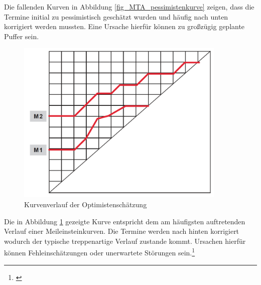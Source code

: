 Die fallenden Kurven in Abbildung \ref{fig_MTA_pessimistenkurve} zeigen, dass die Termine initial zu pessimistisch geschätzt wurden und häufig nach unten korrigiert werden mussten. Eine Ursache hierfür können zu großzügig geplante Puffer sein.

\begin{figure}[h!]
	\centering
	\includegraphics[width=10cm]{kapitel/gruppe4_2/bilder/MTA_optimistenkurve}
	\caption{Kurvenverlauf der Optimistenschätzung}
	\label{fig_MTA_optimistenkurve}
\end{figure}

Die in Abbildung \ref{fig_MTA_optimistenkurve} gezeigte Kurve entspricht dem am häufigsten auftretenden Verlauf einer Meileinsteinkurven. Die Termine werden nach hinten korrigiert wodurch der typische treppenartige Verlauf zustande kommt. Ursachen hierfür können Fehleinschätzungen oder unerwartete Störungen sein.\footnote{\cite{gadatsch_masterkurs_2014}}
